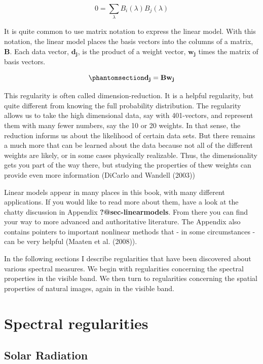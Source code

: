 \documentclass[
  letterpaper,
]{book}
\begin{document}
\[
0 = \sum_{\lambda} B_i(\lambda) B_j(\lambda)
\]

It is quite common to use matrix notation to express the linear model.
With this notation, the linear model places the basis vectors into the
columns of a matrix, \(\mathbf{B}\). Each data vector, \(\mathbf{d_j}\),
is the product of a weight vector, \(\mathbf{w_j}\) times the matrix of
basis vectors.

\begin{equation}\phantomsection\label{eq-linearmatrix}{
\mathbf{d_j} = \mathbf{B} \mathbf{w_j}
}\end{equation}

This regularity is often called dimension-reduction. It is a helpful
regularity, but quite different from knowing the full probability
distribution. The regularity allows us to take the high dimensional
data, say with 401-vectors, and represent them with many fewer numbers,
say the 10 or 20 weights. In that sense, the reduction informs us about
the likelihood of certain data sets. But there remains a much more that
can be learned about the data because not all of the different weights
are likely, or in some cases physically realizable. Thus, the
dimensionality gets you part of the way there, but studying the
properties of thew weights can provide even more information (DiCarlo
and Wandell (2003))

Linear models appear in many places in this book, with many different
applications. If you would like to read more about them, have a look at
the chatty discussion in Appendix \textbf{?@sec-linearmodels}. From
there you can find your way to more advanced and authoritative
literature. The Appendix also contains pointers to important nonlinear
methods that - in some circumstances - can be very helpful (Maaten et
al. (2008)).

In the following sections I describe regularities that have been
discovered about various spectral measures. We begin with regularities
concerning the spectral properties in the visible band. We then turn to
regularities concerning the spatial properties of natural images, again
in the visible band.

\chapter{Spectral regularities}\label{spectral-regularities}

\section{Solar Radiation}\label{solar-radiation}
\end{document}
